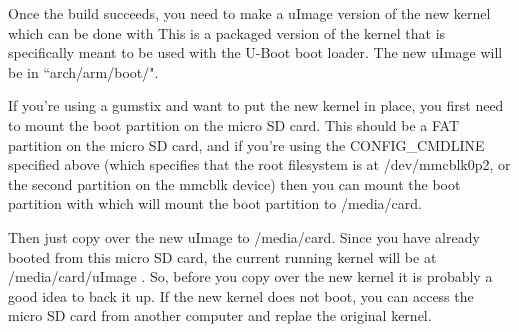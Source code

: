 Once the build succeeds, you need to make a uImage version of the new kernel which can be done with   This is a packaged version of the kernel that is specifically meant to be used with the U-Boot boot loader.  The new uImage will be in ``arch/arm/boot/".

If you're using a gumstix and want to put the new kernel in place, you first need to mount the boot partition on the micro SD card.  This should be a FAT partition on the micro SD card, and if you're using the CONFIG\_CMDLINE specified above (which specifies that the root filesystem is at /dev/mmcblk0p2, or the second partition on the mmcblk device) then you can mount the boot partition with  which will mount the boot partition to /media/card.

Then just copy over the new uImage to /media/card. Since you have already booted from this micro SD card, the current running kernel will be at /media/card/uImage .  So, before you copy over the new kernel it is probably a good idea to back it up.  If the new kernel does not boot, you can access the micro SD card from another computer and replae the original kernel.
